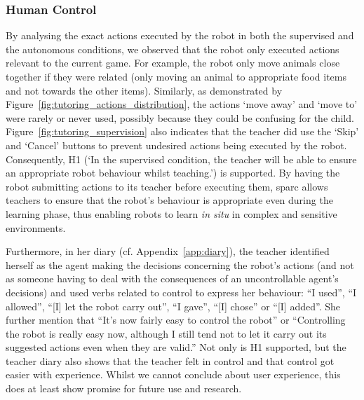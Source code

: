 
\subsubsection{Human Control} \label{sec:tuto_control}
By analysing the exact actions executed by the robot in both the supervised and the autonomous conditions, we observed that the robot only executed actions relevant to the current game. For example, the robot only move animals close together if they were related (only moving an animal to appropriate food items and not towards the other items). Similarly, as demonstrated by Figure~\ref{fig:tutoring_actions_distribution}, the actions `move away' and `move to' were rarely or never used, possibly because they could be confusing for the child. Figure~\ref{fig:tutoring_supervision} also indicates that the teacher did use the `Skip' and `Cancel' buttons to prevent undesired actions being executed by the robot. Consequently, H1 (`In the supervised condition, the teacher will be able to ensure an appropriate robot behaviour whilst teaching.') is supported. By having the robot submitting actions to its teacher before executing them, \gls{sparc} allows teachers to ensure that the robot's behaviour is appropriate even during the learning phase, thus enabling robots to learn \emph{in situ} in complex and sensitive environments.

Furthermore, in her diary (cf. Appendix~\ref{app:diary}), the teacher identified herself as the agent making the decisions concerning the robot's actions (and not as someone having to deal with the consequences of an uncontrollable agent's decisions) and used verbs related to control to express her behaviour: ``I used'', ``I allowed'', ``[I] let the robot carry out'', ``I gave'', ``[I] chose'' or ``[I] added''. She further mention that ``It’s now fairly easy to control the robot'' or ``Controlling the robot is really easy now, although I still tend not to let it carry out its suggested actions even when they are valid.'' 
Not only is H1 supported, but the teacher diary also shows that the teacher felt in control and that control got easier with experience. Whilst we cannot conclude about user experience, this does at least show promise for future use and research.



